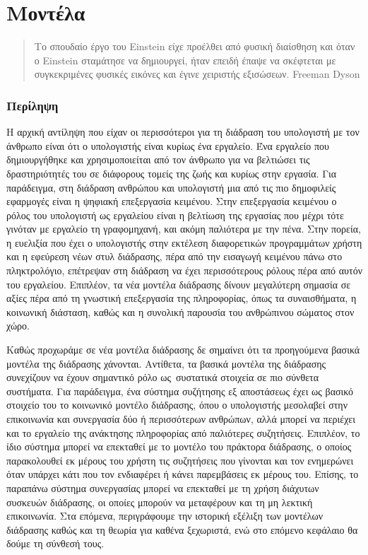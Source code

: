 \documentclass[
]{article}
\begin{document}
\hypertarget{ux3bcux3bfux3bdux3c4ux3adux3bbux3b1}{%
\section{Μοντέλα}\label{ux3bcux3bfux3bdux3c4ux3adux3bbux3b1}}

\begin{quote}
Το σπουδαίο έργο του Einstein είχε προέλθει από φυσική διαίσθηση και
όταν ο Einstein σταμάτησε να δημιουργεί, ήταν επειδή έπαψε να σκέφτεται
με συγκεκριμένες φυσικές εικόνες και έγινε χειριστής εξισώσεων. Freeman
Dyson
\end{quote}

\hypertarget{ux3c0ux3b5ux3c1ux3afux3bbux3b7ux3c8ux3b7}{%
\subsubsection{Περίληψη}\label{ux3c0ux3b5ux3c1ux3afux3bbux3b7ux3c8ux3b7}}

Η αρχική αντίληψη που είχαν οι περισσότεροι για τη διάδραση του
υπολογιστή με τον άνθρωπο είναι ότι ο υπολογιστής είναι κυρίως ένα
εργαλείο. Ένα εργαλείο που δημιουργήθηκε και χρησιμοποιείται από τον
άνθρωπο για να βελτιώσει τις δραστηριότητές του σε διάφορους τομείς της
ζωής και κυρίως στην εργασία. Για παράδειγμα, στη διάδραση ανθρώπου και
υπολογιστή μια από τις πιο δημοφιλείς εφαρμογές είναι η ψηφιακή
επεξεργασία κειμένου. Στην επεξεργασία κειμένου ο ρόλος του υπολογιστή
ως εργαλείου είναι η βελτίωση της εργασίας που μέχρι τότε γινόταν με
εργαλείο τη γραφομηχανή, και ακόμη παλιότερα με την πένα. Στην πορεία, η
ευελιξία που έχει ο υπολογιστής στην εκτέλεση διαφορετικών προγραμμάτων
χρήστη και η εφεύρεση νέων στυλ διάδρασης, πέρα από την εισαγωγή
κειμένου πάνω στο πληκτρολόγιο, επέτρεψαν στη διάδραση να έχει
περισσότερους ρόλους πέρα από αυτόν του εργαλείου. Επιπλέον, τα νέα
μοντέλα διάδρασης δίνουν μεγαλύτερη σημασία σε αξίες πέρα από τη
γνωστική επεξεργασία της πληροφορίας, όπως τα συναισθήματα, η κοινωνική
διάσταση, καθώς και η συνολική παρουσία του ανθρώπινου σώματος στον
χώρο.

Καθώς προχωράμε σε νέα μοντέλα διάδρασης δε σημαίνει ότι τα προηγούμενα
βασικά μοντέλα της διάδρασης χάνονται. Αντίθετα, τα βασικά μοντέλα της
διάδρασης συνεχίζουν να έχουν σημαντικό ρόλο ως~συστατικά στοιχεία σε
πιο σύνθετα συστήματα. Για παράδειγμα, ένα σύστημα συζήτησης εξ
αποστάσεως έχει ως βασικό στοιχείο του το κοινωνικό μοντέλο διάδρασης,
όπου ο υπολογιστής μεσολαβεί στην επικοινωνία και συνεργασία δύο ή
περισσότερων ανθρώπων, αλλά μπορεί να περιέχει και το εργαλείο της
ανάκτησης πληροφορίας από παλιότερες συζητήσεις. Επιπλέον, το ίδιο
σύστημα μπορεί να επεκταθεί με το μοντέλο του πράκτορα διάδρασης, ο
οποίος παρακολουθεί εκ μέρους του χρήστη τις συζητήσεις που γίνονται και
τον ενημερώνει όταν υπάρχει κάτι που τον ενδιαφέρει ή κάνει παρεμβάσεις
εκ μέρους του. Επίσης, το παραπάνω σύστημα συνεργασίας μπορεί να
επεκταθεί με τη χρήση διάχυτων συσκευών διάδρασης, οι οποίες μπορούν να
μεταφέρουν και τη μη λεκτική επικοινωνία. Στα επόμενα, περιγράφουμε την
ιστορική εξέλιξη των μοντέλων διάδρασης καθώς και τη θεωρία για καθένα
ξεχωριστά, ενώ στο επόμενο κεφάλαιο θα δούμε τη σύνθεσή τους.
\end{document}
